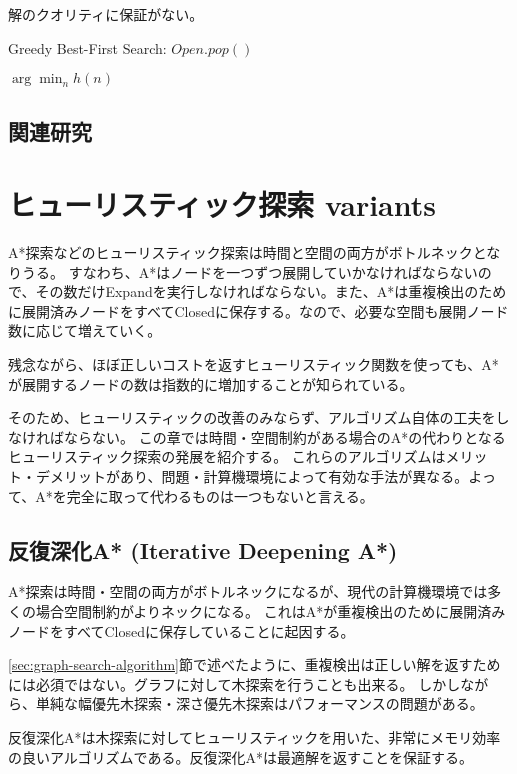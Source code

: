 \documentclass{book}
\begin{document}
解のクオリティに保証がない。

\begin{algorithm}
\caption{Greedy Best-First Search: $Open.pop()$}
\label{alg:gfs-open}
	\Return $\arg \min_n h(n)$
\end{algorithm}



\section{関連研究}

\chapter{ヒューリスティック探索 variants}
\label{ch:heuristic-serach-variants}
A*探索などのヒューリスティック探索は時間と空間の両方がボトルネックとなりうる。
すなわち、A*はノードを一つずつ展開していかなければならないので、その数だけExpandを実行しなければならない。また、A*は重複検出のために展開済みノードをすべてClosedに保存する。なので、必要な空間も展開ノード数に応じて増えていく。

残念ながら、ほぼ正しいコストを返すヒューリスティック関数を使っても、A*が展開するノードの数は指数的に増加することが知られている\cite{}。

そのため、ヒューリスティックの改善のみならず、アルゴリズム自体の工夫をしなければならない。
この章では時間・空間制約がある場合のA*の代わりとなるヒューリスティック探索の発展を紹介する。
これらのアルゴリズムはメリット・デメリットがあり、問題・計算機環境によって有効な手法が異なる。よって、A*を完全に取って代わるものは一つもないと言える。

\section{反復深化A* (Iterative Deepening A*)}
\label{sec:iterative-deepening-astar}

A*探索は時間・空間の両方がボトルネックになるが、現代の計算機環境では多くの場合空間制約がよりネックになる。
これはA*が重複検出のために展開済みノードをすべてClosedに保存していることに起因する。

\ref{sec:graph-search-algorithm}節で述べたように、重複検出は正しい解を返すためには必須ではない。グラフに対して木探索を行うことも出来る。
しかしながら、単純な幅優先木探索・深さ優先木探索はパフォーマンスの問題がある。

反復深化A*は木探索に対してヒューリスティックを用いた、非常にメモリ効率の良いアルゴリズムである。反復深化A*は最適解を返すことを保証する。
\end{document}

